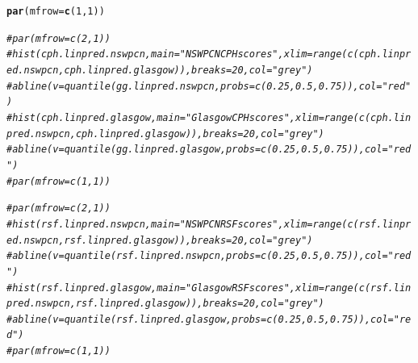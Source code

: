 \documentclass{article}\usepackage[]{graphicx}\usepackage[]{color}
\makeatletter
\newcommand{\hlnum}[1]{\textcolor[rgb]{0.686,0.059,0.569}{#1}}%
\newcommand{\hlcom}[1]{\textcolor[rgb]{0.678,0.584,0.686}{\textit{#1}}}%
\newcommand{\hlstd}[1]{\textcolor[rgb]{0.345,0.345,0.345}{#1}}%
\newcommand{\hlkwc}[1]{\textcolor[rgb]{0.333,0.667,0.333}{#1}}%
\newcommand{\hlkwd}[1]{\textcolor[rgb]{0.737,0.353,0.396}{\textbf{#1}}}%
\newenvironment{kframe}{%
 \def\at@end@of@kframe{}%
 \ifinner\ifhmode%
  \def\at@end@of@kframe{\end{minipage}}%
  \begin{minipage}{\columnwidth}%
 \fi\fi%
 \def\FrameCommand##1{\hskip\@totalleftmargin \hskip-\fboxsep
 \colorbox{shadecolor}{##1}\hskip-\fboxsep
     \hskip-\linewidth \hskip-\@totalleftmargin \hskip\columnwidth}%
 \MakeFramed {\advance\hsize-\width
   \@totalleftmargin\z@ \linewidth\hsize
   \@setminipage}}%
 {\par\unskip\endMakeFramed%
 \at@end@of@kframe}
\newenvironment{knitrout}{}{} %
\makeatother
\begin{document}
\begin{knitrout}
{}


\begin{kframe}\begin{alltt}
\hlkwd{par}\hlstd{(}\hlkwc{mfrow} \hlstd{=} \hlkwd{c}\hlstd{(}\hlnum{1}\hlstd{,} \hlnum{1}\hlstd{))}

\hlcom{# par(mfrow = c(2, 1))}
\hlcom{# hist(cph.linpred.nswpcn, main = "NSWPCN CPH scores", xlim = range(c(cph.linpred.nswpcn, cph.linpred.glasgow)), breaks = 20, col = "grey")}
\hlcom{# abline(v = quantile(gg.linpred.nswpcn, probs = c(0.25, 0.5, 0.75)), col = "red")}
\hlcom{# hist(cph.linpred.glasgow, main = "Glasgow CPH scores", xlim = range(c(cph.linpred.nswpcn, cph.linpred.glasgow)), breaks = 20, col = "grey")}
\hlcom{# abline(v = quantile(gg.linpred.glasgow, probs = c(0.25, 0.5, 0.75)), col = "red")}
\hlcom{# par(mfrow = c(1, 1))}

\hlcom{# par(mfrow = c(2, 1))}
\hlcom{# hist(rsf.linpred.nswpcn, main = "NSWPCN RSF scores", xlim = range(c(rsf.linpred.nswpcn, rsf.linpred.glasgow)), breaks = 20, col = "grey")}
\hlcom{# abline(v = quantile(rsf.linpred.nswpcn, probs = c(0.25, 0.5, 0.75)), col = "red")}
\hlcom{# hist(rsf.linpred.glasgow, main = "Glasgow RSF scores", xlim = range(c(rsf.linpred.nswpcn, rsf.linpred.glasgow)), breaks = 20, col = "grey")}
\hlcom{# abline(v = quantile(rsf.linpred.glasgow, probs = c(0.25, 0.5, 0.75)), col = "red")}
\hlcom{# par(mfrow = c(1, 1))}
\end{alltt}
\end{kframe}
\end{knitrout}
\end{document}
